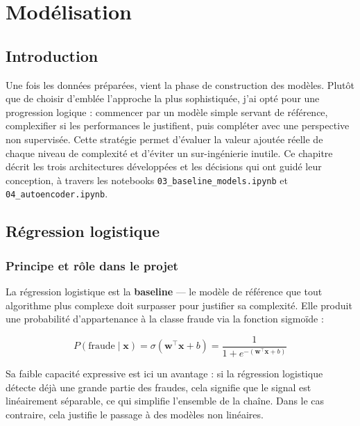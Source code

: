 \chapter{Modélisation}

\section*{Introduction}

Une fois les données préparées, vient la phase de construction des modèles. Plutôt que de
choisir d'emblée l'approche la plus sophistiquée, j'ai opté pour une progression logique :
commencer par un modèle simple servant de référence, complexifier si les performances le
justifient, puis compléter avec une perspective non supervisée. Cette stratégie permet
d'évaluer la valeur ajoutée réelle de chaque niveau de complexité et d'éviter un
sur-ingénierie inutile. Ce chapitre décrit les trois architectures développées et les
décisions qui ont guidé leur conception, à travers les notebooks
\texttt{03\_baseline\_models.ipynb} et \texttt{04\_autoencoder.ipynb}.

\section{Régression logistique}

\subsection{Principe et rôle dans le projet}

La régression logistique est la \textbf{baseline} --- le modèle de référence que tout
algorithme plus complexe doit surpasser pour justifier sa complexité. Elle produit une
probabilité d'appartenance à la classe fraude via la fonction sigmoïde :

\[
P(\text{fraude} \mid \mathbf{x}) = \sigma(\mathbf{w}^\top \mathbf{x} + b)
= \frac{1}{1 + e^{-(\mathbf{w}^\top \mathbf{x} + b)}}
\]

Sa faible capacité expressive est ici un avantage : si la régression logistique détecte
déjà une grande partie des fraudes, cela signifie que le signal est linéairement séparable,
ce qui simplifie l'ensemble de la chaîne. Dans le cas contraire, cela justifie le passage
à des modèles non linéaires.

